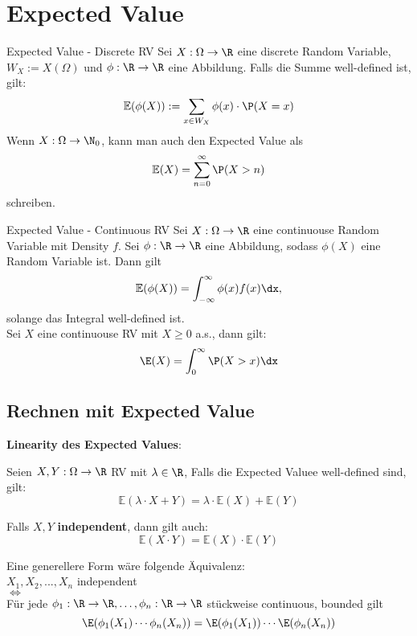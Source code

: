 \section{Expected Value}
\begin{mainbox}{Expected Value - Discrete RV}
    Sei $X: \Omega \to \R$ eine discrete Random Variable, $W_X := X(\Omega)$ und $\phi: \R \to \R$ eine Abbildung. Falls die Summe well-defined ist, gilt: 
    $$\mathbb{E}(\phi(X)) := \sum_{x \in W_X} \phi(x) \cdot \P(X = x)$$
    Wenn $X: \Omega \to \N_0$, kann man auch den Expected Value als
    $$\mathbb{E}(X) = \sum_{n = 0}^{\infty}\P(X > n)$$
    schreiben.
\end{mainbox}
\begin{mainbox}{Expected Value - Continuous RV}
    Sei $X: \Omega \to \R$ eine continuouse Random Variable mit Density $f$. Sei $\phi: \R \to \R$ eine Abbildung, sodass $\phi(X)$ eine Random Variable ist. Dann gilt
    $$\mathbb{E}(\phi(X))= \int_{-\infty}^\infty \phi(x)f(x)\dx,$$
    solange das Integral well-defined ist.
    \\Sei $X$ eine continuouse RV mit $X \geq 0$ a.s., dann gilt:
    $$\E(X)=\int_0^\infty \P(X > x)\dx$$ 
\end{mainbox}

\subsection{Rechnen mit Expected Value}
\textbf{Linearity des Expected Values}: 

Seien $X, Y: \Omega \to \R$ RV mit $\lambda \in \R$, Falls die Expected Valuee well-defined sind, gilt:
$$\mathbb{E}(\lambda \cdot X + Y) = \lambda \cdot \mathbb{E}(X) + \mathbb{E}(Y)$$

Falls $X, Y$ \textbf{independent}, dann gilt auch:
$$\mathbb{E}(X \cdot Y) = \mathbb{E}(X) \cdot \mathbb{E}(Y)$$

Eine generellere Form wäre folgende Äquivalenz:\\
$X_1, X_2, ...,X_n$ independent
\\$\iff$
\\Für jede $\phi_1: \R \to \R, \ldots, \phi_n: \R \to \R$ stückweise continuous, bounded gilt
$$\E(\phi_1(X_1)\cdots\phi_n(X_n))=\E(\phi_1(X_1))\cdots\E(\phi_n(X_n))$$ 

